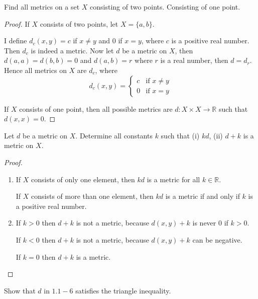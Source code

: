 \begin{exercise}\label{chapter1:section1:exercise4}
    Find all metrics on a set $X$ consisting of two points. Consisting of one point.
\end{exercise}

\begin{proof}
    If $X$ consists of two points, let $X = \{ a, b \}$.

    I define $d_{c}(x, y) = c$ if $x\ne y$ and $0$ if $x = y$, where $c$ is a positive real number. Then $d_{c}$ is indeed a metric. Now let $d$ be a metric on $X$, then $d(a, a) = d(b, b) = 0$ and $d(a, b) = r$ where $r$ is a real number, then $d = d_{r}$. Hence all metrics on $X$ are $d_{c}$, where
    \[
        d_{c}(x, y) = \begin{cases}
            c & \text{if $x\ne y$} \\
            0 & \text{if $x = y$}
        \end{cases}
    \]

    If $X$ consists of one point, then all possible metrics are $d: X\times X\to \mathbb{R}$ such that $d(x, x) = 0$.
\end{proof}

\begin{exercise}\label{chapter1:section1:exercise5}
    Let $d$ be a metric on $X$. Determine all constants $k$ such that (i) $kd$, (ii) $d + k$ is a metric on $X$.
\end{exercise}

\begin{proof}
    \begin{enumerate}[label={(\roman*)}]
        \item If $X$ consists of only one element, then $kd$ is a metric for all $k\in\mathbb{R}$.

              If $X$ consists of more than one element, then $kd$ is a metric if and only if $k$ is a positive real number.
        \item If $k > 0$ then $d + k$ is not a metric, because $d(x, y) + k$ is never $0$ if $k > 0$.

              If $k < 0$ then $d + k$ is not a metric, because $d(x, y) + k$ can be negative.

              If $k = 0$ then $d + k$ is a metric.
    \end{enumerate}
\end{proof}

\begin{exercise}\label{chapter1:section1:exercise6}
    Show that $d$ in $1.1-6$ satisfies the triangle inequality.
\end{exercise}

